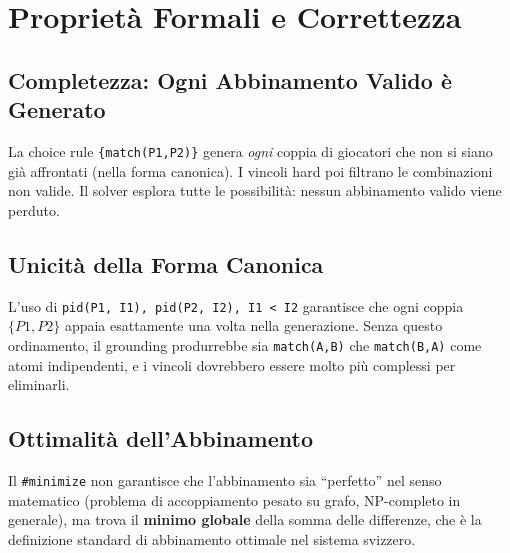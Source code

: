 \documentclass[12pt,a4paper]{article}
\begin{document}
\section{Proprietà Formali e Correttezza}

\subsection{Completezza: Ogni Abbinamento Valido è Generato}

La choice rule \texttt{\{match(P1,P2)\}} genera \emph{ogni} coppia di giocatori
che non si siano già affrontati (nella forma canonica). I vincoli hard poi
filtrano le combinazioni non valide. Il solver esplora tutte le possibilità:
nessun abbinamento valido viene perduto.

\subsection{Unicità della Forma Canonica}

L'uso di \texttt{pid(P1, I1), pid(P2, I2), I1 < I2} garantisce che ogni coppia
$\{P1, P2\}$ appaia esattamente una volta nella generazione. Senza questo
ordinamento, il grounding produrrebbe sia \texttt{match(A,B)} che
\texttt{match(B,A)} come atomi indipendenti, e i vincoli dovrebbero essere
molto più complessi per eliminarli.

\subsection{Ottimalità dell'Abbinamento}

Il \texttt{\#minimize} non garantisce che l'abbinamento sia ``perfetto'' nel
senso matematico (problema di accoppiamento pesato su grafo, NP-completo in
generale), ma trova il \textbf{minimo globale} della somma delle differenze,
che è la definizione standard di abbinamento ottimale nel sistema svizzero.
\end{document}
